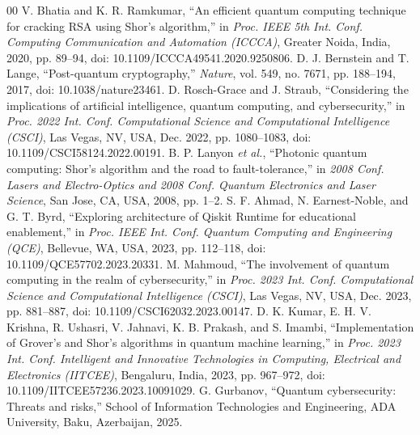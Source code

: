 \documentclass[conference]{IEEEtran}
\begin{document}
\begin{thebibliography}{00}
 V. Bhatia and K. R. Ramkumar, ``An efficient quantum computing technique for cracking RSA using Shor's algorithm,'' in \textit{Proc. IEEE 5th Int. Conf. Computing Communication and Automation (ICCCA)}, Greater Noida, India, 2020, pp. 89--94, doi: 10.1109/ICCCA49541.2020.9250806.
 D. J. Bernstein and T. Lange, ``Post-quantum cryptography,'' \textit{Nature}, vol. 549, no. 7671, pp. 188--194, 2017, doi: 10.1038/nature23461.
 D. Rosch-Grace and J. Straub, ``Considering the implications of artificial intelligence, quantum computing, and cybersecurity,'' in \textit{Proc. 2022 Int. Conf. Computational Science and Computational Intelligence (CSCI)}, Las Vegas, NV, USA, Dec. 2022, pp. 1080--1083, doi: 10.1109/CSCI58124.2022.00191.
 B. P. Lanyon \textit{et al.}, ``Photonic quantum computing: Shor's algorithm and the road to fault-tolerance,'' in \textit{2008 Conf. Lasers and Electro-Optics and 2008 Conf. Quantum Electronics and Laser Science}, San Jose, CA, USA, 2008, pp. 1--2.
 S. F. Ahmad, N. Earnest-Noble, and G. T. Byrd, ``Exploring architecture of Qiskit Runtime for educational enablement,'' in \textit{Proc. IEEE Int. Conf. Quantum Computing and Engineering (QCE)}, Bellevue, WA, USA, 2023, pp. 112--118, doi: 10.1109/QCE57702.2023.20331.
 M. Mahmoud, ``The involvement of quantum computing in the realm of cybersecurity,'' in \textit{Proc. 2023 Int. Conf. Computational Science and Computational Intelligence (CSCI)}, Las Vegas, NV, USA, Dec. 2023, pp. 881--887, doi: 10.1109/CSCI62032.2023.00147.
 D. K. Kumar, E. H. V. Krishna, R. Ushasri, V. Jahnavi, K. B. Prakash, and S. Imambi, ``Implementation of Grover's and Shor's algorithms in quantum machine learning,'' in \textit{Proc. 2023 Int. Conf. Intelligent and Innovative Technologies in Computing, Electrical and Electronics (IITCEE)}, Bengaluru, India, 2023, pp. 967--972, doi: 10.1109/IITCEE57236.2023.10091029.
 G. Gurbanov, ``Quantum cybersecurity: Threats and risks,'' School of Information Technologies and Engineering, ADA University, Baku, Azerbaijan, 2025.
\end{thebibliography}
\end{document}
